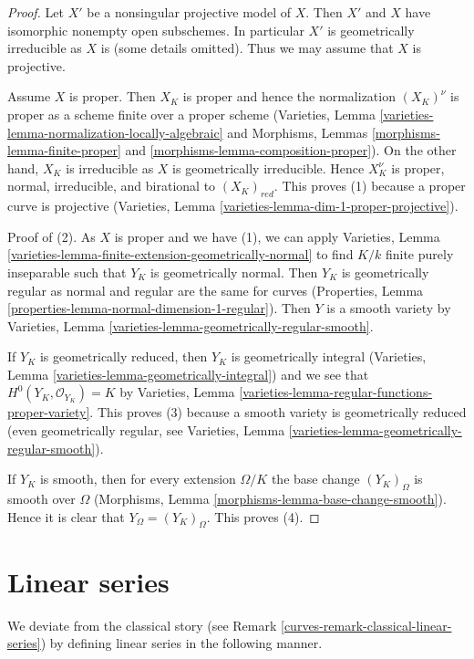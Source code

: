 \begin{proof}
Let $X'$ be a nonsingular projective model of $X$. Then $X'$ and
$X$ have isomorphic nonempty open subschemes. In particular
$X'$ is geometrically irreducible as $X$ is (some details omitted).
Thus we may assume that $X$ is projective.

\medskip\noindent
Assume $X$ is proper. Then $X_K$ is proper and hence the normalization
$(X_K)^\nu$ is proper as a scheme finite over a proper scheme
(Varieties, Lemma \ref{varieties-lemma-normalization-locally-algebraic}
and Morphisms, Lemmas \ref{morphisms-lemma-finite-proper} and
\ref{morphisms-lemma-composition-proper}).
On the other hand, $X_K$ is irreducible as $X$ is geometrically
irreducible. Hence $X_K^\nu$ is proper, normal, irreducible, and birational
to $(X_K)_{red}$. This proves (1) because a proper curve is projective
(Varieties, Lemma \ref{varieties-lemma-dim-1-proper-projective}).

\medskip\noindent
Proof of (2). As $X$ is proper and we have (1), we can apply
Varieties, Lemma \ref{varieties-lemma-finite-extension-geometrically-normal}
to find $K/k$ finite purely inseparable such that
$Y_K$ is geometrically normal. Then $Y_K$ is geometrically regular
as normal and regular are the same for curves
(Properties, Lemma \ref{properties-lemma-normal-dimension-1-regular}).
Then $Y$ is a smooth variety by
Varieties, Lemma \ref{varieties-lemma-geometrically-regular-smooth}.

\medskip\noindent
If $Y_K$ is geometrically reduced, then $Y_K$ is geometrically
integral (Varieties, Lemma \ref{varieties-lemma-geometrically-integral})
and we see that $H^0(Y_K, \mathcal{O}_{Y_K}) = K$ by
Varieties, Lemma \ref{varieties-lemma-regular-functions-proper-variety}.
This proves (3) because a smooth variety is geometrically reduced
(even geometrically regular, see
Varieties, Lemma \ref{varieties-lemma-geometrically-regular-smooth}).

\medskip\noindent
If $Y_K$ is smooth, then for every extension $\Omega/K$
the base change $(Y_K)_\Omega$ is smooth over $\Omega$
(Morphisms, Lemma \ref{morphisms-lemma-base-change-smooth}).
Hence it is clear that $Y_\Omega = (Y_K)_\Omega$. This proves (4).
\end{proof}

\section{Linear series}
\label{curves-section-linear-series}
We deviate from the classical story
(see Remark \ref{curves-remark-classical-linear-series})
by defining linear series in the following manner.

